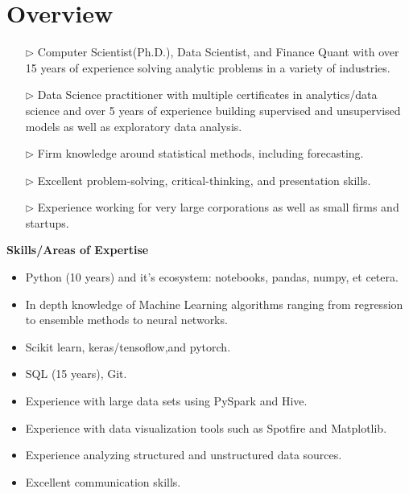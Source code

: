 \documentclass[10pt, letterpaper]{article} %
\providecommand{\tightlist}{%
  \setlength{\itemsep}{0pt}\setlength{\parskip}{0pt}}
\begin{document}
\vspace{-5pt}
\hypertarget{professional-experience}{\section{\texorpdfstring{
{ \textbf{ {Overview}}}}{Overview}}\label{professional-experience}}
\begin{itemize}
\tightlist

\item[$\triangleright$] Computer Scientist(Ph.D.), Data Scientist, and Finance Quant with over 15 years of experience solving analytic problems in a variety of industries. 

\item[$\triangleright$] Data Science practitioner with multiple certificates in analytics/data science and over 5 years of experience building supervised and unsupervised models as well as exploratory data analysis. 

\item[$\triangleright$] Firm knowledge around statistical methods, including forecasting.

\item[$\triangleright$]  Excellent problem-solving, critical-thinking, and presentation skills.

\item[$\triangleright$]  Experience working for very large corporations as well as small firms and startups.

\end{itemize}
{\textbf {Skills/Areas of Expertise}}
\vspace{-7pt}
\begin{multicols}{2}
  \begin{itemize}
	\tightlist
	\item Python (10 years) and it's ecosystem: notebooks, pandas, numpy, et cetera.
	\item In depth knowledge of Machine Learning algorithms ranging from regression to ensemble methods to neural networks.	
	\item Scikit learn, keras/tensoflow,and pytorch.
	\item SQL (15 years), Git.
	\item Experience with large data sets using PySpark and Hive.
	\item Experience with data visualization tools such as Spotfire and Matplotlib.
	\item Experience analyzing structured and unstructured data sources.
     \item Excellent communication skills.
\end{itemize}
\end{multicols}
\end{document}
